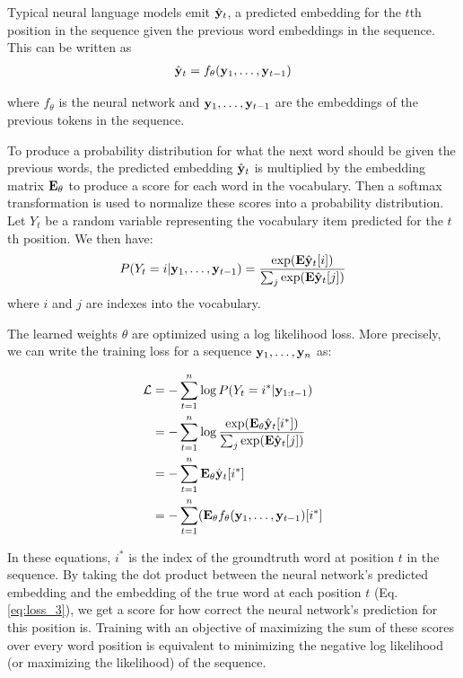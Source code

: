 Typical neural language models emit $\hat{\mathbf{y}}_t$, a predicted embedding for the $t$th position in the sequence given the previous word embeddings in the sequence. This can be written as
\begin{align}
    \hat{\mathbf{y}}_t = f_\theta(\mathbf{y}_1, \ldots, \mathbf{y}_{t-1})
    \label{eq:lm_feq}
\end{align}

\noindent where $f_\theta$ is the neural network and $\mathbf{y}_1, \ldots, \mathbf{y}_{t-1}$ are the embeddings of the previous tokens in the sequence.

To produce a probability distribution for what the next word should be given the previous words, the predicted embedding $\hat{\mathbf{y}}_t$ is multiplied by the embedding matrix $\mathbf{E}_\theta$ to produce a score for each word in the vocabulary.
Then a softmax transformation is used to normalize these scores into a probability distribution.
Let $Y_t$ be a random variable representing the vocabulary item predicted for the $t$th position. We then have:
\begin{align}
    \label{equation:vocab}
    P(Y_t=i | \mathbf{y}_1, \ldots, \mathbf{y}_{t-1}) = \frac{\exp(\mathbf{E}\hat{\mathbf{y}}_t[i])}{\sum_j\exp(\mathbf{E}\hat{\mathbf{y}}_t[j])}
\end{align}
where $i$ and $j$ are indexes into the vocabulary.

The learned weights $\theta$ are optimized using a log likelihood loss.
More precisely, we can write the training loss for a sequence $\mathbf{y}_1, \ldots, \mathbf{y}_n$ as:

\begin{align}
\mathcal{L} &= -\sum_{t=1}^n \log P(Y_t=i^* | \mathbf{y}_{1:t-1}) \\
&= -\sum_{t=1}^n \log\frac{\exp(\mathbf{E}_\theta\hat{\mathbf{y}}_t[i^*])}{\sum_j\exp(\mathbf{E}\hat{\mathbf{y}}_t[j])} \label{eq:loss_2} \\
&= -\sum_{t=1}^n \mathbf{E}_\theta\hat{\mathbf{y}}_t[i^*] \label{eq:loss_3} \\
&= -\sum_{t=1}^n (\mathbf{E}_\theta f_\theta(\mathbf{y}_1, \ldots, \mathbf{y}_{t-1})[i^*]
\end{align}

In these equations, $i^*$ is the index of the groundtruth word at position $t$ in the sequence. 
By taking the dot product between the neural network's predicted embedding and the embedding of the true word at each position $t$ (Eq. \ref{eq:loss_3}), we get a score for how correct the neural network's prediction for this position is.
Training with an objective of maximizing the sum of these scores over every word position is equivalent to minimizing the negative log likelihood (or maximizing the likelihood) of the sequence.

